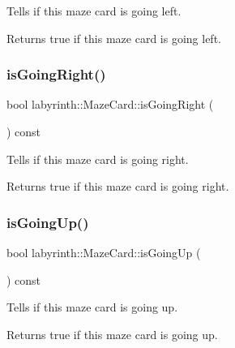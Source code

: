 Tells if this maze card is going left. 

\begin{DoxyReturn}{Returns}
true if this maze card is going left. 
\end{DoxyReturn}
\mbox{\label{structlabyrinth_1_1_maze_card_a97b349c57d3bad5d88ef541a481fe93b}} 
\subsubsection{\texorpdfstring{isGoingRight()}{isGoingRight()}}
{\footnotesize\ttfamily bool labyrinth\+::\+Maze\+Card\+::is\+Going\+Right (\begin{DoxyParamCaption}{ }\end{DoxyParamCaption}) const\hspace{0.3cm}{\ttfamily [inline]}}



Tells if this maze card is going right. 

\begin{DoxyReturn}{Returns}
true if this maze card is going right. 
\end{DoxyReturn}
\mbox{\label{structlabyrinth_1_1_maze_card_a61d4cb61ddac8e88c5df81b355efd718}} 
\subsubsection{\texorpdfstring{isGoingUp()}{isGoingUp()}}
{\footnotesize\ttfamily bool labyrinth\+::\+Maze\+Card\+::is\+Going\+Up (\begin{DoxyParamCaption}{ }\end{DoxyParamCaption}) const\hspace{0.3cm}{\ttfamily [inline]}}



Tells if this maze card is going up. 

\begin{DoxyReturn}{Returns}
true if this maze card is going up. 
\end{DoxyReturn}
\mbox{\label{structlabyrinth_1_1_maze_card_ae4c534a31b1ac1616d7116d9eb1a39fd}} 
